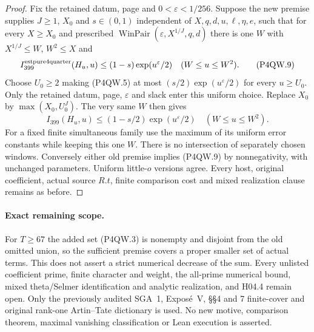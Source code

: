\begin{proof}
Fix the retained datum, page and $0<\varepsilon<1/256$.
Suppose the new premise supplies $J\geq1$, $X_0$ and
$s\in(0,1)$ independent of $X,q,d,u,\ell,\eta,e$, such that
for every $X\geq X_0$ and prescribed
$\operatorname{WinPair}(\varepsilon,X^{1/J},q,d)$ there is
one $W$ with $X^{1/J}\leq W$, $W^2\leq X$ and
\[
 I_{399}^{\rm estpure4quarter}(H_u,u)\leq(1-s)\exp(u^\varepsilon/2)
                                      \quad(W\leq u\leq W^2).
 \tag{P4QW.9}
\]
Choose $U_0\geq2$ making (P4QW.5) at most
$(s/2)\exp(u^\varepsilon/2)$ for every $u\geq U_0$.
Only the retained datum, page, $\varepsilon$ and slack enter
this uniform choice.  Replace $X_0$ by $\max(X_0,U_0^J)$.
The very same $W$ then gives
\[
 I_{399}(H_u,u)\leq(1-s/2)\exp(u^\varepsilon/2)
                                      \quad(W\leq u\leq W^2).
 \tag{P4QW.10}
\]
For a fixed finite simultaneous family use the maximum of its
uniform error constants while keeping this one $W$.
There is no intersection of separately chosen windows.
Conversely either old premise implies (P4QW.9) by nonnegativity,
with unchanged parameters.  Uniform little-$o$ versions agree.
Every host, original coefficient, actual source $R.t$, finite
comparison cost and mixed realization clause remains as before.
\end{proof}

\paragraph{Exact remaining scope.}
For $T\geq67$ the added set (P4QW.3) is nonempty and disjoint
from the old omitted union, so the sufficient premise covers a
proper smaller set of actual terms.
This does not assert a strict numerical decrease of the sum.
Every unlisted coefficient prime, finite character and weight,
the all-prime numerical bound, mixed theta/Selmer identification
and analytic realization, and H04.4 remain open.
Only the previously audited SGA~1, Expos\'e~V, \S\S4 and 7
finite-cover and original rank-one Artin--Tate dictionary is used.
No new motive, comparison theorem, maximal vanishing classification
or Lean execution is asserted.
